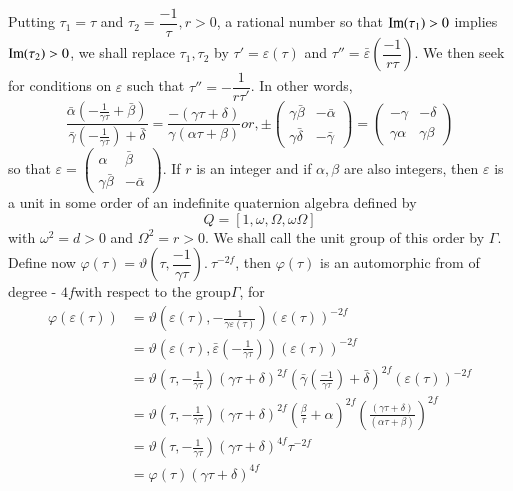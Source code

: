 Putting $\tau_1 = \tau$ and $\tau_2 = \dfrac{-1}{\tau}, r > 0$, a
rational number so that $\operatorname{Im} (\tau_1) > 0$ implies $\operatorname{Im} (\tau_2) > 0$,
we shall replace $\tau_1, \tau_2$ by $\tau' = \varepsilon (\tau)$ and
$\tau'' = \bar{\varepsilon}(\dfrac{-1}{r \tau})$. We then seek for
conditions on $\varepsilon$ such that $\tau'' = - \dfrac{1}{r
  \tau'}$. In other words, 
$$
\frac{\bar{\alpha} \left(- \frac{1}{\gamma
    \tau}+\bar{\beta}\right)}{\bar{\gamma}(- \frac{1}{\gamma
    \tau})+\bar{\delta}}= \frac{- (\gamma \tau +
  \delta)}{\gamma(\alpha \tau +\beta)} or, \pm \begin{pmatrix} \gamma
  \bar{\beta} & - \bar{\alpha} \\ \gamma \bar{\delta} &
  -\bar{\gamma} \end{pmatrix} = \begin{pmatrix} -\gamma & -\delta
  \\ \gamma \alpha & \gamma \beta \end{pmatrix} 
$$
so that $\varepsilon = \begin{pmatrix} \alpha & \bar{\beta} \\ \gamma
  \bar{\beta} & - \bar{\alpha} \end{pmatrix}$. If $r$ is an integer
and if $\alpha, \beta$ are also integers, then $\varepsilon$ is a unit
in some order of an indefinite quaternion algebra defined by  
$$
Q = [1, \omega, \Omega, \omega \Omega]
$$
with $\omega^2 = d > 0$ and $\Omega^2 = r > 0$. We shall call the unit
group of this order by $\Gamma$. Define now $\varphi (\tau ) =
\vartheta (\tau, \dfrac{-1}{\gamma \tau}).~ \tau^{-2f}$, then $\varphi
(\tau)$ is an automorphic from of degree - $4f$with respect to the
group\pageoriginale $\Gamma$, for 
\begin{align*}
  \varphi(\varepsilon(\tau)) & = \vartheta \left(\varepsilon(\tau), -
  \frac{1}{\gamma \varepsilon(\tau)}\right) (\varepsilon(\tau))^{-2f}\\ 
  & = \vartheta \left(\varepsilon (\tau),
  \bar{\varepsilon}\left(-\frac{1}{\gamma \tau}\right)\right)
  (\varepsilon (\tau))^{-2f}\\  
  & = \vartheta\left(\tau, -\frac{1}{\gamma \tau}\right) (\gamma \tau +
  \delta)^{2f} \left(\bar{\gamma} \left(\frac{-1}{\gamma \tau}\right) +
  \bar{\delta}\right)^{2f}(\varepsilon(\tau ))^{-2f}\\ 
  & = \vartheta \left(\tau, -\frac{1}{\gamma \tau}\right) (\gamma \tau +
  \delta)^{2f}\left(\frac{\beta}{\tau}+\alpha\right)^{2f}\left(\frac{(\gamma
    \tau+\delta)}{(\alpha \tau + \beta)}\right)^{2f}\\ 
  &= \vartheta \left(\tau,  -\frac{1}{\gamma \tau}\right) \left(
  \gamma \tau + \delta \right)^{4f} \tau^{-2f}\\ 
  &= \varphi(\tau) \left( \gamma \tau + \delta \right)^{4f}
\end{align*}

